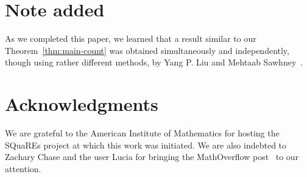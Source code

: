 \documentclass{daj}
\begin{document}
\section*{Note added}
As we completed this paper, we learned that a result similar to our Theorem~\ref{thm:main-count} 
was obtained simultaneously and independently, though using rather different methods, by Yang P. Liu and Mehtaab Sawhney~\cite{LM24}. 


\section*{Acknowledgments} %
We are grateful to the American Institute of Mathematics for hosting the SQuaREs project at which this work was initiated. We are also indebted to Zachary Chase and the user Lucia for bringing the MathOverflow post~\cite{T17} to our attention.
\end{document}
